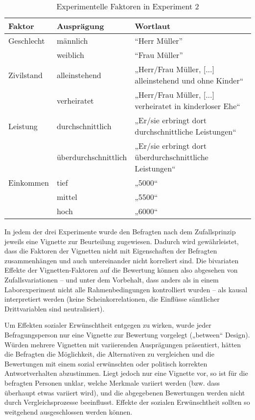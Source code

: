 \documentclass[a4paper,12pt]{article}
\renewcommand{\baselinestretch}{1.1}
\newif\ifcomments
\newcommand{\comment}[1]{%
    \ifcomments\marginpar{\renewcommand{\baselinestretch}{1}\tiny\hspace*{-1.1em}\colorbox{gray!20}%
    {\textcolor{red}{\parbox[t]{.9in}{\raggedright #1}}}}\fi}
\begin{document}
\begin{table}
    \small
    \caption{Experimentelle Faktoren in Experiment 2}\label{tab-ex2-faktoren}
    \begin{tabularx}{\textwidth}{@{}llX@{}}
        \toprule
        Faktor          & Ausprägung & Wortlaut       \\\midrule
        Geschlecht      & männlich     & “Herr Müller”   \\
                        & weiblich     & “Frau Müller”   \\
        \addlinespace
        Zivilstand   & alleinstehend         & „Herr/Frau Müller, [...] alleinstehend und ohne Kinder“ \\
                        & verheiratet         & „Herr/Frau Müller, [...] verheiratet in kinderloser Ehe“ \\
        \addlinespace
        Leistung        & durchschnittlich         & „Er/sie erbringt dort durchschnittliche Leistungen“   \\
                        & überdurchschnittlich         & „Er/sie erbringt dort überdurchschnittliche Leistungen“  \\
	  \addlinespace
        Einkommen        & tief         & „5000“   \\
					& mittel & „5500“   \\
					& hoch & „6000“   \\
        \bottomrule
    \end{tabularx}
\end{table}

In jedem der drei Experimente wurde den Befragten nach dem Zufallsprinzip jeweils eine Vignette
zur Beurteilung zugewiesen. Dadurch wird gewährleistet, dass die
Faktoren der Vignetten nicht mit Eigenschaften der Befragten zusammenhängen und
auch untereinander nicht korreliert sind. Die bivariaten Effekte der
Vignetten-Faktoren auf die Bewertung können also abgesehen von
Zufallsvariationen – und unter dem Vorbehalt, dass anders als in einem
Laborexperiment nicht alle Rahmenbedingungen kontrolliert wurden – als
kausal interpretiert werden (keine Scheinkorrelationen, die Einflüsse
sämtlicher Drittvariablen sind neutralisiert). \comment{Scheinkorrelation ist eigentlich ein blödes Wort, Scheinkausalität wäre treffender...}
Um Effekten sozialer Erwünschtheit entgegen zu wirken, wurde jeder
Befragungsperson nur eine Vignette zur Bewertung vorgelegt („between“ Design).
Würden mehrere Vignetten mit variierenden Ausprägungen präsentiert, hätten die
Befragten die Möglichkeit, die Alternativen zu vergleichen und die Bewertungen
mit einem sozial erwünschten oder politisch korrekten Antwortverhalten
abzustimmen. Liegt jedoch nur eine Vignette vor, so ist für die befragten
Personen unklar, welche Merkmale variiert werden (bzw. dass überhaupt etwas
variiert wird), und die abgegebenen Bewertungen werden nicht durch
Vergleichsprozesse beeinflusst. Effekte der sozialen Erwünschtheit sollten so
weitgehend ausgeschlossen werden können. \\
\end{document}

